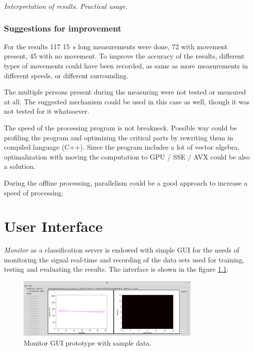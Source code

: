 {\it Interpretation of results. Practical usage. }


\subsection*{Suggestions for improvement}
For the results 117 15~s long measurements were done, 72 with movement present, 45 with no movement.
To improve the accuracy of the results, different types of movements could have been recorded, as same
as more measurements in different speeds, or different surrounding.

The multiple persons present during the measuring were not tested or measured at all. The suggested mechanism
could be used in this case as well, though it was not tested for it whatsoever.

The speed of the processing program is not breakneck. Possible way could be profiling the program and optimizing
the critical parts by rewriting them in compiled language (C++). Since the program includes a lot of vector
algebra, optimalization with moving the computation to GPU / SSE / AVX could be also a solution.

During the offline processing, parallelism could be a good approach to increase a speed of processing.




\chapter{User Interface}
\label{Label:UI}

{\it Monitor} as a classification server is endowed with simple GUI for the needs of monitoring
the signal real-time and recording of the data sets used for training, testing and evaluating the results.
The interface is shown in the figure \ref{fig:monitorGUI}.

\begin{figure}[h!]
\begin{center}
\includegraphics[width=0.8\textwidth]{render/gui.png}
\caption{Monitor GUI prototype with sample data. \label{fig:monitorGUI}}
\end{center}
\end{figure}

